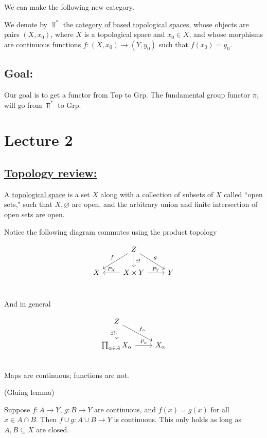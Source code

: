 \documentclass[x11names,reqno,14pt]{extarticle}
\begin{document}
We can make the following new category. 


We denote by $\Top^*$ the \underline{category of based topological spaces}, whose objects are pairs $(X, x_0)$, where $X$ is a topological space and $x_0 \in X$, and whose morphisms are continuous functions $f:(X,x_0)\to(Y, y_0)$ such that $f(x_0) = y_0$. 

\subsection*{Goal:}

Our goal is to get a functor from Top to Grp. The fundamental group functor $\pi_1$ will go from $\Top^*$ to Grp.

\section*{Lecture 2}

\subsection*{\underline{Topology review:}}


A \underline{topological space} is a set $X$ along with a collection of subsets of $X$ called ``open sets," such that $X, \varnothing$ are open, and the arbitrary union and finite intersection of open sets are open. 

Notice the following diagram commutes using the product topology

\[
\begin{tikzcd}
&\ar[ld, "f"'] \ar[d, dotted, "\exists !"]Z \ar[rd, "g"] &  \\
X  &\ar[l, "P_X"'] X\times Y \ar[r, "P_Y"] & Y\\
\end{tikzcd}
\]

And in general 

\[
\begin{tikzcd}
Z \ar[d, dotted, "\exists !"']  \ar[rd, "f_\alpha"] & \\
\prod_{\alpha\in A}X_\alpha \ar[r, "P_\alpha"]& X_\alpha\\
\end{tikzcd}
\]
Maps are continuous; functions are not. 

\lem (Gluing lemma)

Suppose $f:A\to Y$, $g:B\to Y$ are continuous, and $f(x) = g(x)$ for all $x \in A \cap B$. Then $f\cup g: A \cup B \to Y$ is continuous. This only holds as long as $A, B \subseteq X$ are closed. 
\end{document}
